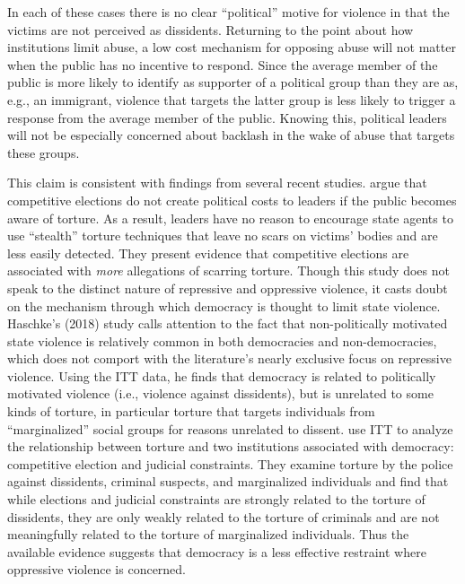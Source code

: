 \documentclass[11pt]{article}
\begin{document}
In each of these cases there is no clear ``political'' motive for violence in that the victims are not perceived as dissidents. Returning to the point about how institutions limit abuse, a low cost mechanism for opposing abuse will not matter when the public has no incentive to respond. Since the average member of the public is more likely to identify as supporter of a political group than they are as, e.g., an immigrant, violence that targets the latter group is less likely to trigger a response from the average member of the public. Knowing this, political leaders will not be especially concerned about backlash in the wake of abuse that targets these groups. 

This claim is consistent with findings from several recent studies. \citet{ConradHillMoore2018} argue that competitive elections do not create political costs to leaders if the public becomes aware of torture. As a result, leaders have no reason to encourage state agents to use ``stealth'' torture techniques that leave no scars on victims' bodies and are less easily detected. They present evidence that competitive elections are associated with {\em more} allegations of scarring torture. Though this study does not speak to the distinct nature of repressive and oppressive violence, it casts doubt on the mechanism through which democracy is thought to limit state violence. Haschke's (2018) study calls attention to the fact that non-politically motivated state violence is relatively common in both democracies and non-democracies, which does not comport with the literature's nearly exclusive focus on repressive violence. Using the ITT data, he finds that democracy is related to politically motivated violence (i.e., violence against dissidents), but is unrelated to some kinds of torture, in particular torture that targets individuals from ``marginalized'' social groups for reasons unrelated to dissent. \citet{JacksonHillHall2018} use ITT to analyze the relationship between torture and two  institutions associated with democracy: competitive election and judicial constraints. They examine torture by the police against dissidents, criminal suspects, and marginalized individuals and find that while elections and judicial constraints are strongly related to the torture of dissidents, they are only weakly related to the torture of criminals and are not meaningfully related to the torture of marginalized individuals. Thus the available evidence suggests that democracy is a less effective restraint where oppressive violence is concerned.       
\end{document}
